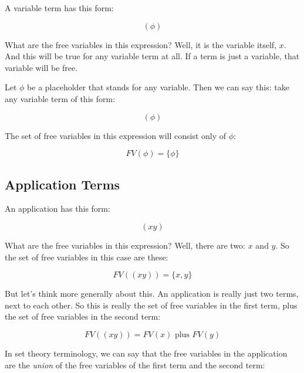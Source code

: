 \documentclass{book}
\numberwithin{equation}{chapter}
\begin{document}
A variable term has this form:

\begin{equation}
(\phi)
\end{equation}

\noindent
What are the free variables in this expression? Well, it is the variable itself, $x$. And this will be true for any variable term at all. If a term is just a variable, that variable will be free. 

Let $\phi$ be a placeholder that stands for any variable. Then we can say this: take any variable term of this form:

\begin{equation}
(\phi)
\end{equation}

\noindent
The set of free variables in this expression will consist only of $\phi$:

\begin{equation}
FV(\phi) = \{ \phi \}
\end{equation}


\subsection{Application Terms}

An application has this form:

\begin{equation}
(x y)
\end{equation}

\noindent
What are the free variables in this expression? Well, there are two: $x$ and $y$. So the set of free variables in this case are these:

\begin{equation}
FV((x y)) = \{ x, y \}
\end{equation}

\noindent
But let's think more generally about this. An application is really just two terms, next to each other. So this is really the set of free variables in the first term, plus the set of free variables in the second term:

\begin{equation}
FV((x y)) = FV(x) \text{ plus } FV(y)
\end{equation}

\noindent
In set theory terminology, we can say that the free variables in the application are the \textit{union} of the free variables of the first term and the second term:
\end{document}

